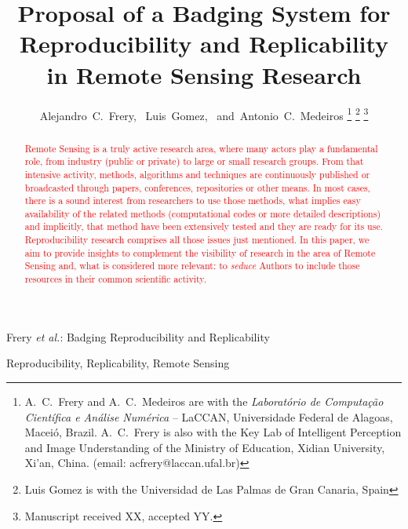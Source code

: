\documentclass[journal,twoside]{IEEEtran}
\begin{document}
	
\title{Proposal of a Badging System for Reproducibility and Replicability in Remote Sensing Research}
	
\author{Alejandro~C.~Frery,~
Luis~Gomez,~
and~Antonio~C.~Medeiros%
\thanks{A.\ C.\ Frery and A.\ C.\ Medeiros are with the \textit{Laborat\'orio de Computa\c c\~ao Cient\'ifica e An\'alise Num\'erica} -- LaCCAN, Universidade Federal de Alagoas, Macei\'o, Brazil.
A.\ C.\ Frery is also with the Key Lab of Intelligent Perception and Image Understanding of the Ministry of Education, Xidian University, Xi'an, China. (email: acfrery@laccan.ufal.br)}%
\thanks{Luis Gomez is with the Universidad de Las Palmas de Gran Canaria, Spain}%
\thanks{Manuscript received XX, accepted YY.}}
	
%
{Frery \MakeLowercase{\textit{et al.}}: Badging Reproducibility and Replicability}
	
\maketitle
	
\begin{abstract}
\textcolor{red}{Remote Sensing is a truly active research area, where many actors play a fundamental role, from industry (public or private) to large or small research groups. 
From that intensive activity, methods, algorithms and techniques are continuously published or broadcasted through papers, conferences, repositories or other means. 
In most cases, there is a sound interest from researchers to use those methods, what implies easy availability of the related methods (computational codes or more detailed descriptions) and implicitly, that method have been extensively tested and they are ready for its use. 
Reproducibility research comprises all those issues just mentioned. In this paper, we aim to provide insights to complement the visibility of research in the area of Remote Sensing and, what is considered more relevant: to \textit{seduce} Authors to include those resources  in their common scientific activity.}
\end{abstract}
	
\begin{IEEEkeywords}
Reproducibility,
Replicability,
Remote Sensing
\end{IEEEkeywords}
	
\end{document}
